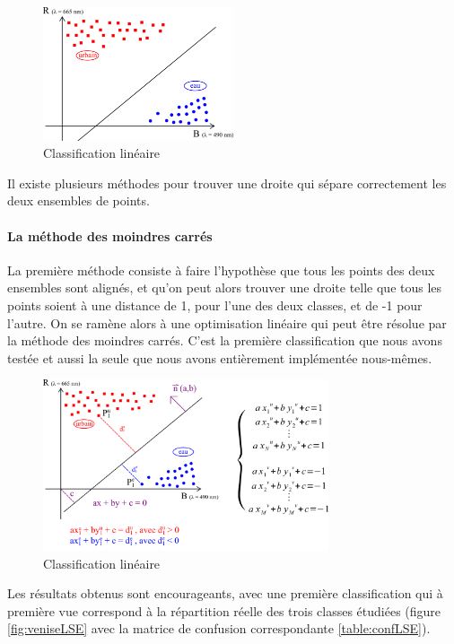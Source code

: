 \documentclass[a4paper,10pt]{report}
\begin{document}
\begin{figure}[H]
  \centering
    \includegraphics[width=0.5\textwidth]{ml_lin.png}
  \caption{Classification linéaire}
  \label{fig:ml_lin}
\end{figure}

Il existe plusieurs méthodes pour trouver une droite qui sépare correctement les deux ensembles de points.

\paragraph{La méthode des moindres carrés}
  La première méthode consiste à faire l'hypothèse que tous les points des deux ensembles sont alignés, et qu'on peut alors trouver une droite telle que tous les points soient à une distance de 1, pour l'une des deux classes, et de -1 pour l'autre. On se ramène alors à une optimisation linéaire qui peut être résolue par la méthode des moindres carrés.
  C'est la première classification que nous avons testée et aussi la seule que nous avons entièrement implémentée nous-mêmes. 
  
  \begin{figure}[H]
  \centering
    \includegraphics[width=0.75\textwidth]{ml_lse}
  \caption{Classification linéaire}
  \label{fig:ml_lse}
\end{figure}
  
\label{lineaire}
 Les résultats obtenus sont encourageants, avec une première classification qui à première vue correspond à la répartition réelle des trois classes étudiées (figure \ref{fig:veniseLSE} avec la matrice de confusion correspondante \ref{table:confLSE}).
\end{document}
